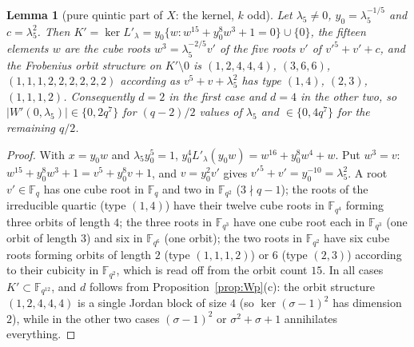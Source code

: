 \documentclass[11pt,a4paper]{amsart}
\newtheorem{lemma}[theorem]{Lemma}
\theoremstyle{definition}
\newcommand{\F}{\mathbb{F}}
\begin{document}
\begin{lemma}[pure quintic part of $X$: the kernel, $k$ odd]\label{lem:Wpquintic}
Let $\lambda_5\ne0$, $y_0=\lambda_5^{-1/5}$ and $c=\lambda_5^2$. Then $K'=\ker L'_\lambda=y_0\{w:w^{15}+y_0^8w^3+1=0\}\cup\{0\}$, the fifteen elements $w$ are the cube roots $w^3=\lambda_5^{-2/5}v'$ of the five roots $v'$ of $v'^5+v'+c$, and the Frobenius orbit structure on $K'\setminus0$ is $(1,2,4,4,4)$, $(3,6,6)$, $(1,1,1,2,2,2,2,2,2)$ according as $v^5+v+\lambda_5^2$ has type $(1,4)$, $(2,3)$, $(1,1,1,2)$. Consequently $d=2$ in the first case and $d=4$ in the other two, so $|W'(0,\lambda_5)|\in\{0,2q^7\}$ for $(q-2)/2$ values of $\lambda_5$ and $\in\{0,4q^7\}$ for the remaining $q/2$.
\end{lemma}
\begin{proof}
With $x=y_0w$ and $\lambda_5y_0^5=1$, $y_0^4L'_\lambda(y_0w)=w^{16}+y_0^8w^4+w$. Put $w^3=v$: $w^{15}+y_0^8w^3+1=v^5+y_0^8v+1$, and $v=y_0^2v'$ gives $v'^5+v'=y_0^{-10}=\lambda_5^2$. A root $v'\in\F_q$ has one cube root in $\F_q$ and two in $\F_{q^2}$ ($3\nmid q-1$); the roots of the irreducible quartic (type $(1,4)$) have their twelve cube roots in $\F_{q^4}$ forming three orbits of length $4$; the three roots in $\F_{q^3}$ have one cube root each in $\F_{q^3}$ (one orbit of length $3$) and six in $\F_{q^6}$ (one orbit); the two roots in $\F_{q^2}$ have six cube roots forming orbits of length $2$ (type $(1,1,1,2)$) or $6$ (type $(2,3)$) according to their cubicity in $\F_{q^2}$, which is read off from the orbit count $15$. In all cases $K'\subset\F_{q^{12}}$, and $d$ follows from Proposition~\ref{prop:Wp}(c): the orbit structure $(1,2,4,4,4)$ is a single Jordan block of size $4$ (so $\ker(\sigma-1)^2$ has dimension $2$), while in the other two cases $(\sigma-1)^2$ or $\sigma^2+\sigma+1$ annihilates everything.
\end{proof}
\end{document}
